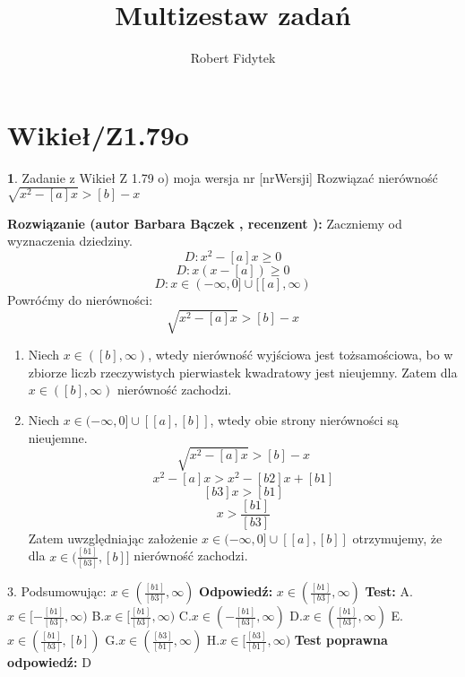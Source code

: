 \documentclass[12pt, a4paper]{article}
\title{Multizestaw zadań}
\author{Robert Fidytek}
\date{}
\theoremstyle{definition} %
\newtheorem{zad}{}
\newcommand{\kategoria}[1]{\section{#1}} %
\newcommand{\zadStart}[1]{\begin{zad}#1\newline} %
\newcommand{\zadStop}{\end{zad}}   %
\newcommand{\rozwStart}[2]{\noindent \textbf{Rozwiązanie (autor #1 , recenzent #2): }\newline} %
\newcommand{\rozwStop}{\newline}                                            %
\newcommand{\odpStart}{\noindent \textbf{Odpowiedź:}\newline}    %
\newcommand{\odpStop}{\newline}                                             %
\newcommand{\testStart}{\noindent \textbf{Test:}\newline} %
\newcommand{\testStop}{\newline} %
\newcommand{\kluczStart}{\noindent \textbf{Test poprawna odpowiedź:}\newline} %
\newcommand{\kluczStop}{\newline} %
\begin{document}
\maketitle


\kategoria{Wikieł/Z1.79o}
\zadStart{Zadanie z Wikieł Z 1.79 o) moja wersja nr [nrWersji]}
Rozwiązać nierówność $\sqrt{x^2-[a]x}>[b]-x$
\zadStop
\rozwStart{Barbara Bączek}{}
Zaczniemy od wyznaczenia dziedziny.
$$D:x^2 - [a]x \geq 0$$
$$D:x(x-[a]) \geq 0$$
$$D: x \in (-\infty,0] \cup [[a], \infty)$$
Powróćmy do nierówności:
$$\sqrt{x^2-[a]x}>[b]-x$$
\begin{enumerate}
\item Niech $x \in ([b], \infty)$, wtedy nierówność wyjściowa jest tożsamościowa, bo w zbiorze liczb rzeczywistych pierwiastek kwadratowy jest nieujemny. Zatem dla $x \in ([b], \infty)$ nierówność zachodzi.
\item  Niech $x \in (-\infty, 0] \cup [[a],[b]]$, wtedy obie strony nierówności są nieujemne.
$$\sqrt{x^2-[a]x}>[b]-x$$
$$x^2 -[a]x>x^2 -[b2]x +[b1] $$
$$[b3]x>[b1]$$
$$x>\frac{[b1]}{[b3]}$$
Zatem uwzględniając założenie $x \in (-\infty, 0] \cup [[a],[b]]$ otrzymujemy, że dla $x \in (\frac{[b1]}{[b3]},[b]]$ nierówność zachodzi.
\end{enumerate}
3. Podsumowując: $x \in (\frac{[b1]}{[b3]}, \infty)$
\rozwStop
\odpStart
$x \in (\frac{[b1]}{[b3]}, \infty)$
\odpStop
\testStart
A.$x \in [-\frac{[b1]}{[b3]}, \infty)$
B.$x \in [\frac{[b1]}{[b3]}, \infty)$
C.$x \in (-\frac{[b1]}{[b3]}, \infty)$
D.$x \in (\frac{[b1]}{[b3]}, \infty)$
E.$x \in (\frac{[b1]}{[b3]}, [b])$
G.$x \in (\frac{[b3]}{[b1]}, \infty)$
H.$x \in [\frac{[b3]}{[b1]}, \infty)$
\testStop
\kluczStart
D
\kluczStop
\end{document}
